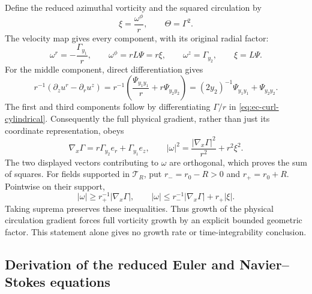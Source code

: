 Define the reduced azimuthal vorticity and the squared circulation by
\[
 \xi=\frac{\omega^\phi}{r},\qquad \Theta=\Gamma^2.
\]
The velocity map gives every component, with its original radial factor:
\begin{equation}
 \omega^r=-\frac{\Gamma_{y_1}}r,\qquad
 \omega^\phi=rL\Psi=r\xi,\qquad
 \omega^z=\Gamma_{y_2},\qquad \xi=L\Psi.
 \label{eq:ec-full-vorticity}
\end{equation}
For the middle component, direct differentiation gives
\[
 r^{-1}(\partial_z u^r-\partial_r u^z)
 =r^{-1}\left(\frac{\Psi_{y_1y_1}}r
                          +r\Psi_{y_2y_2}\right)
 =(2y_2)^{-1}\Psi_{y_1y_1}+\Psi_{y_2y_2}.
\]
The first and third components follow by differentiating \(\Gamma/r\)
in \eqref{eq:ec-curl-cylindrical}.  Consequently the full physical
gradient, rather than just its coordinate representation, obeys
\begin{equation}
 \nabla_x\Gamma=r\Gamma_{y_2}e_r+\Gamma_{y_1}e_z,
 \qquad
 |\omega|^2=\frac{|\nabla_x\Gamma|^2}{r^2}+r^2\xi^2.
 \label{eq:ec-gradient-vorticity}
\end{equation}
The two displayed vectors contributing to \(\omega\) are orthogonal,
which proves the sum of squares.
For fields supported in \(\mathcal T_R\), put
\(r_-=r_0-R>0\) and \(r_+=r_0+R\).  Pointwise on their support,
\[
 |\omega|\geq r_+^{-1}|\nabla_x\Gamma|,
 \qquad
 |\omega|\leq r_-^{-1}|\nabla_x\Gamma|+r_+|\xi|.
\]
Taking suprema preserves these inequalities.  Thus growth of the
physical circulation gradient forces full vorticity growth by an
explicit bounded geometric factor.  This statement alone gives no
growth rate or time-integrability conclusion.

\subsection{Derivation of the reduced Euler and Navier--Stokes equations}

